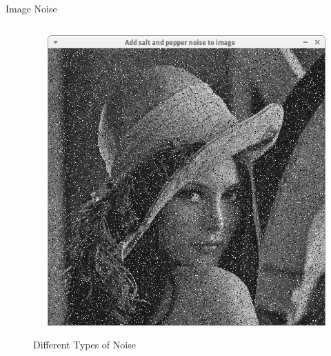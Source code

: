 \documentclass{beamer}
\begin{document}
\begin{frame}[t]{Image Noise}
\begin{figure}
\begin{columns}[onlytextwidth]
\begin{column}{0.45\textwidth}
                \label{fig:sub1}
            \end{column}
            \begin{column}{0.45\textwidth}
                \centering
                \includegraphics[width=.8\linewidth, scale=0.2]{img/salr_pepper.png}
                \label{fig:sub2}
            \end{column}
        \end{columns}
        \caption{Different Types of Noise}
        \label{fig:images}
    \end{figure}    
\end{frame}
\end{document}
